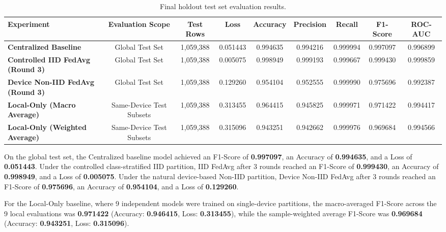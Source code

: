 \documentclass[11pt,a4paper]{article}
\begin{document}
\begin{table}[htbp]
\centering
\caption{Final holdout test set evaluation results.}
\begin{adjustbox}{width=\textwidth,center}
\begin{tabular}{l c c c c c c c c}
\toprule
\textbf{Experiment} & \textbf{Evaluation Scope} & \textbf{Test Rows} & \textbf{Loss} & \textbf{Accuracy} & \textbf{Precision} & \textbf{Recall} & \textbf{F1-Score} & \textbf{ROC-AUC} \\
\midrule
\textbf{Centralized Baseline} & Global Test Set & 1,059,388 & 0.051443 & 0.994635 & 0.994216 & 0.999994 & 0.997097 & 0.996899 \\
\textbf{Controlled IID FedAvg (Round 3)} & Global Test Set & 1,059,388 & 0.005075 & 0.998949 & 0.999193 & 0.999667 & 0.999430 & 0.999859 \\
\textbf{Device Non-IID FedAvg (Round 3)} & Global Test Set & 1,059,388 & 0.129260 & 0.954104 & 0.952555 & 0.999990 & 0.975696 & 0.992387 \\
\textbf{Local-Only (Macro Average)} & Same-Device Test Subsets & 1,059,388 & 0.313455 & 0.964415 & 0.945825 & 0.999971 & 0.971422 & 0.994417 \\
\textbf{Local-Only (Weighted Average)} & Same-Device Test Subsets & 1,059,388 & 0.315096 & 0.943251 & 0.942662 & 0.999976 & 0.969684 & 0.994566 \\
\bottomrule
\end{tabular}
\end{adjustbox}
\end{table}

On the global test set, the Centralized baseline model achieved an F1-Score of \textbf{0.997097}, an Accuracy of \textbf{0.994635}, and a Loss of \textbf{0.051443}. Under the controlled class-stratified IID partition, IID FedAvg after 3 rounds reached an F1-Score of \textbf{0.999430}, an Accuracy of \textbf{0.998949}, and a Loss of \textbf{0.005075}. Under the natural device-based Non-IID partition, Device Non-IID FedAvg after 3 rounds reached an F1-Score of \textbf{0.975696}, an Accuracy of \textbf{0.954104}, and a Loss of \textbf{0.129260}.

For the Local-Only baseline, where 9 independent models were trained on single-device partitions, the macro-averaged F1-Score across the 9 local evaluations was \textbf{0.971422} (Accuracy: \textbf{0.946415}, Loss: \textbf{0.313455}), while the sample-weighted average F1-Score was \textbf{0.969684} (Accuracy: \textbf{0.943251}, Loss: \textbf{0.315096}).
\end{document}
